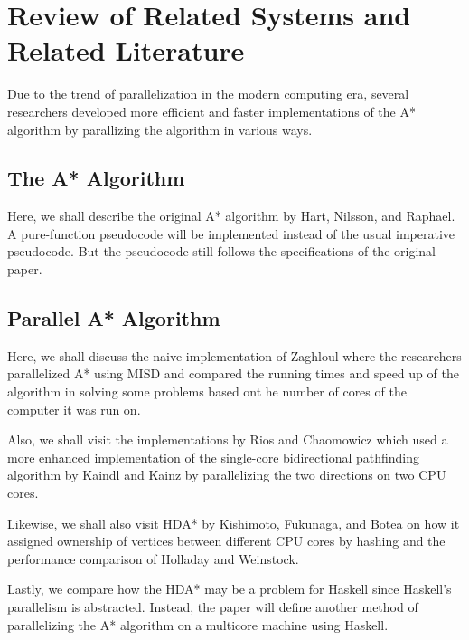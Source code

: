 \chapter{Review of Related Systems and Related Literature}

Due to the trend of parallelization in the modern computing era, \cite{Rios2011,WeinstockHolladay,ZaghloulAlJami2017,Sanz2016}
several researchers developed more efficient and faster implementations 
of the A* algorithm by parallizing the algorithm in various ways.

\section{The A* Algorithm}
Here, we shall describe the original A* algorithm by Hart, Nilsson, and Raphael.\cite{HartNilssonRaphael1968}
A pure-function pseudocode will be implemented instead of the usual imperative 
pseudocode. But the pseudocode still follows the specifications of the original paper.

\section{Parallel A* Algorithm}
Here, we shall discuss the naive implementation of Zaghloul\cite{ZaghloulAlJami2017}
where the researchers parallelized A* using MISD and compared the running times and speed up 
of the algorithm in solving some problems based ont he number of cores of the computer it was run on.

Also, we shall visit the implementations by Rios and Chaomowicz\cite{Rios2011}
which used a more enhanced implementation of the single-core bidirectional pathfinding algorithm by 
Kaindl and Kainz\cite{KainlKainz1997} by parallelizing the two directions on two CPU cores.

Likewise, we shall also visit HDA* by Kishimoto, Fukunaga, and Botea\cite{Kishimoto2009} on how it 
assigned ownership of vertices between different CPU cores by hashing and the performance comparison of
Holladay and Weinstock\cite{WeinstockHolladay}.

Lastly, we compare how the HDA* may be a problem for Haskell since 
Haskell's parallelism is abstracted. Instead, the paper will define 
another method of parallelizing the A* algorithm on a multicore machine 
using Haskell.

